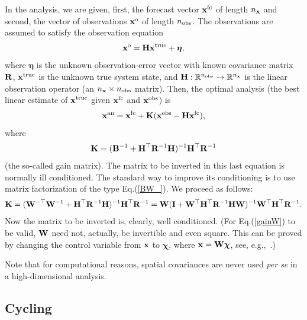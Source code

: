 \documentclass[12pt]{article}
\newcommand{\R}{{\mathbb R}}
\newcommand{\eg}{e.g.,\ }
\begin{document}
In the analysis, we are given, first, the forecast vector ${\bf x}^{\rm fc}$ of length $n_{\bf x}$ and second,
the vector of observations ${\bf x}^{\rm o}$ of length $n_{\rm obs}$.
The observations are assumed to satisfy the observation equation
%
\begin {equation}
\label{xo} 
{\bf x}^{\rm o} = {\bf H} {\bf x}^{\rm true} + \boldsymbol\eta,
\end {equation}
%
where $\boldsymbol\eta$ is the unknown observation-error vector with known covariance
matrix ${\bf R}$, ${\bf x}^{\rm true}$ is the unknown true system state, and
${\bf H}: \R^{n_{\rm obs}} \to \R^{n_{\bf x}}$ is the linear observation operator 
(an $n_{\bf x} \times n_{\rm obs}$ matrix).
Then, the optimal analysis (the best linear estimate of ${\bf x}^{\rm true}$ given ${\bf x}^{\rm fc}$ 
and ${\bf x}^{\rm obs}$) is
%
\begin {equation}
\label{anls} 
{\bf x}^{\rm an} = {\bf x}^{\rm fc} + {\bf K}({\bf x}^{\rm obs} - {\bf H}{\bf x}^{\rm fc}),
\end {equation}
%
where 
%
\begin {equation}
\label{gain} 
{\bf K} = ({\bf B}^{-1} + {\bf H}^\top {\bf R}^{-1}{\bf H})^{-1} {\bf H}^\top {\bf R}^{-1}
\end {equation}
%
(the so-called gain matrix).
The matrix to be inverted in this last equation is normally ill conditioned. The standard way
to improve its conditioning is to use matrix factorization of the type Eq.(\ref{BW_}).
We proceed as follows:
%
\begin {equation}
\label{gainW} 
{\bf K} = ({\bf W}^{-\top}{\bf W}^{-1} + {\bf H}^\top {\bf R}^{-1}{\bf H})^{-1} {\bf H}^\top {\bf R}^{-1} =
{\bf W} ({\bf I} + {\bf W}^\top{\bf H}^\top {\bf R}^{-1}{\bf H}{\bf W})^{-1} {\bf W}^\top{\bf H}^\top {\bf R}^{-1}.
\end {equation}
%
Now the matrix to be inverted is, clearly, well conditioned.
(For Eq.(\ref{gainW}) to be valid, ${\bf W}$ need not, actually, be
invertible and even square. This can be proved by changing the control variable from ${\bf x}$
to $\boldsymbol\chi$, where ${\bf x} = {\bf W} \boldsymbol\chi$, see, \eg \citet[][]{Lorenc3DV}.)

Note that for computational reasons, spatial covariances are never used {\em per se} in a high-dimensional
analysis.




\subsection {Cycling}
\label{sec_cyc}
\end{document}
